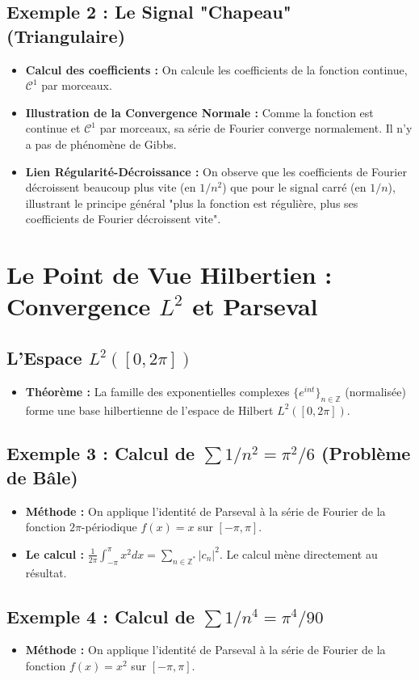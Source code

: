 \documentclass[12pt, a4paper, parskip=full]{report}
\theoremstyle{agregstyle}
\begin{document}
\subsection{Exemple 2 : Le Signal "Chapeau" (Triangulaire)}
\begin{itemize}
    \item \textbf{Calcul des coefficients :} On calcule les coefficients de la fonction continue, $\mathcal{C}^1$ par morceaux.
    \item \textbf{Illustration de la Convergence Normale :} Comme la fonction est continue et $\mathcal{C}^1$ par morceaux, sa série de Fourier converge normalement. Il n'y a pas de phénomène de Gibbs.
    \item \textbf{Lien Régularité-Décroissance :} On observe que les coefficients de Fourier décroissent beaucoup plus vite (en $1/n^2$) que pour le signal carré (en $1/n$), illustrant le principe général "plus la fonction est régulière, plus ses coefficients de Fourier décroissent vite".
\end{itemize}

\section{Le Point de Vue Hilbertien : Convergence $L^2$ et Parseval}
\subsection{L'Espace $L^2([0,2\pi])$}
\begin{itemize}
    \item \textbf{Théorème :} La famille des exponentielles complexes $\{e^{int}\}_{n \in \mathbb{Z}}$ (normalisée) forme une base hilbertienne de l'espace de Hilbert $L^2([0, 2\pi])$.
\end{itemize}
\subsection{Exemple 3 : Calcul de $\sum 1/n^2 = \pi^2/6$ (Problème de Bâle)}
\begin{itemize}
    \item \textbf{Méthode :} On applique l'identité de Parseval à la série de Fourier de la fonction $2\pi$-périodique $f(x)=x$ sur $[-\pi, \pi]$.
    \item \textbf{Le calcul :} $\frac{1}{2\pi}\int_{-\pi}^{\pi} x^2 dx = \sum_{n \in \mathbb{Z}^*} |c_n|^2$. Le calcul mène directement au résultat.
\end{itemize}
\subsection{Exemple 4 : Calcul de $\sum 1/n^4 = \pi^4/90$}
\begin{itemize}
    \item \textbf{Méthode :} On applique l'identité de Parseval à la série de Fourier de la fonction $f(x)=x^2$ sur $[-\pi, \pi]$.
\end{itemize}
\end{document}
